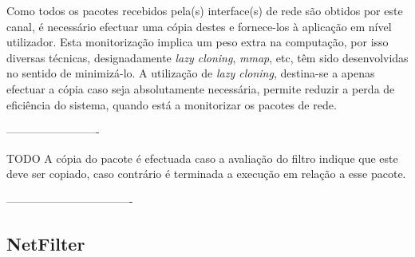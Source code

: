  

Como todos os pacotes recebidos pela(s) interface(s) de rede são obtidos por este canal, é necessário efectuar uma cópia destes e fornece-los à aplicação em nível utilizador.
Esta monitorização implica um peso extra na computação, por isso diversas técnicas, designadamente \textit{lazy cloning}, \textit{mmap}, etc, têm sido desenvolvidas no sentido de minimizá-lo.
A utilização de \textit{lazy cloning}, destina-se a apenas efectuar a cópia caso seja absolutamente necessária, permite reduzir a perda de eficiência do sistema, quando está a monitorizar os pacotes de rede.

-------------------------

TODO
A cópia do pacote é efectuada caso a avaliação do filtro indique que este deve ser copiado, caso contrário é terminada a execução em relação a esse pacote.

----------------------------------



\subsection{NetFilter}



